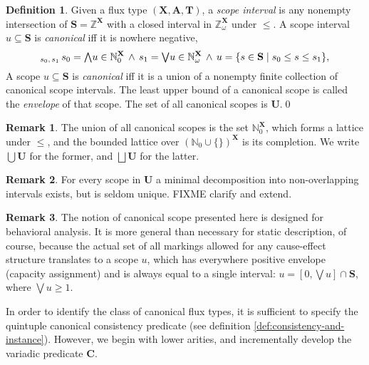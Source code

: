 \documentclass [a4paper,12pt] {article}
\theoremstyle{definition}
\newtheorem{definition}{Definition}[section]
\newtheorem{remark}{Remark}[section]
\newcommand{\Exists}{}
\DeclareRobustCommand{\Exists}{\mathop{\mathlarger{\exists}}}
\newcommand{\xtop}{}
\DeclareRobustCommand{\xtop}{\mathop{\textstyle\mathsmaller{\bm\top}}}
\begin{document}
\begin {definition}\label {def:canonical-scope}
  Given a flux type $(\mathbf {X}, \mathbf {A}, \mathbf {T})$, a {\em
    scope interval}\/ is any nonempty intersection of $\mathbf {S} =
  \mathbb {Z}^{\mathbf {X}}$ with a closed interval in $\mathbb
          {Z}_{\omega}^{\mathbf {X}}$ under $\leq$.  A scope interval
          $u \subseteq \mathbf {S}$ is {\em canonical}\/ iff it is
          nowhere negative,
  \begin {equation*}
  \Exists_{s_0,\,s_1}\,
  s_0 = \mathsmaller{\bigwedge}u \in \mathbb {N}_0^\mathbf {X} \,\land\,
  s_1 = \mathsmaller{\bigvee}u \in \mathbb {N}_\omega^\mathbf {X} \,\land\,
  u = \{ s \in \mathbf {S} \;|\; s_0 \leq s \leq s_1 \},
  \end {equation*}
  A scope $u \subseteq \mathbf {S}$ is {\em canonical}\/ iff it is a
  union of a nonempty finite collection of canonical scope intervals.
  The least upper bound of a canonical scope is called the {\em
    envelope}\/ of that scope.  The set of all canonical scopes is
  $\mathbf {U}$.\qed
\end {definition}

\begin {remark}
  The union of all canonical scopes is the set $\mathbb {N}_0^{\mathbf
    {X}}$, which forms a lattice under $\leq$, and the bounded lattice
  over $(\mathbb {N}_0\cup\{\xtop\})^{\mathbf {X}}$ is its completion.
  We write $\bigcup\mathbf {U}$ for the former, and $\bigsqcup\mathbf
  {U}$ for the latter.
\end {remark}

\begin {remark}
  For every scope in $\mathbf {U}$ a minimal decomposition into
  non-overlapping intervals exists, but is seldom unique.  FIXME
  clarify and extend.
\end {remark}

\begin {remark}
  The notion of canonical scope presented here is designed for
  behavioral analysis.  It is more general than necessary for static
  description, of course, because the actual set of all markings
  allowed for any cause-effect structure translates to a scope $u$,
  which has everywhere positive envelope (capacity assignment) and is
  always equal to a single interval: $u = [0, {\bigvee}u] \cap \mathbf
  {S}$, where ${\bigvee}u \geq 1$.
\end {remark}

In order to identify the class of canonical flux types, it is
sufficient to specify the quintuple canonical consistency predicate
(see definition \ref {def:consistency-and-instance}).  However, we
begin with lower arities, and incrementally develop the variadic
predicate $\bm {C}$.
\end{document}
